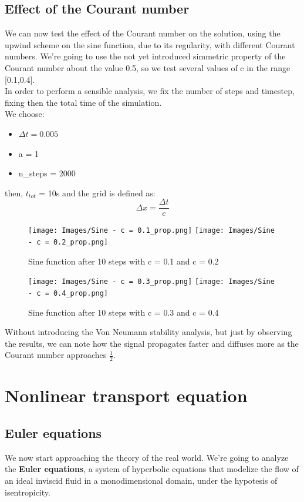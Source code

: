 \documentclass{report}
\begin{document}
\section*{Effect of the Courant number}
We can now test the effect of the Courant number on the solution, using the upwind scheme on the sine function, due to its regularity, with different Courant numbers.
We're going to use the not yet introduced simmetric property of the Courant number about the value 0.5, so we test several values of c in the range [0.1,0.4].\\
In order to perform a sensible analysis, we fix the number of steps and timestep, fixing then the total time of the simulation.\\
We choose:
\begin{itemize}[label={}]
    \item $\Delta t = 0.005$
    \item a = 1
    \item n\_steps = 2000
\end{itemize}
then, $t_{tot}$ = 10s and the grid is defined as:
\begin{equation*}
    \Delta x = \frac{\Delta t}{c}
\end{equation*}
\begin{figure}[H]
    \centering
    \texttt{[image: Images/Sine - c = 0.1\_prop.png]}
    \texttt{[image: Images/Sine - c = 0.2\_prop.png]}
    \caption{Sine function after 10 steps with c = 0.1 and c = 0.2}
    \label{fig:sine_res_c}
\end{figure}
\begin{figure}[H]
    \centering
    \texttt{[image: Images/Sine - c = 0.3\_prop.png]}
    \texttt{[image: Images/Sine - c = 0.4\_prop.png]}
    \caption{Sine function after 10 steps with c = 0.3 and c = 0.4}
    \label{fig:sine_res_c2}
\end{figure}

Without introducing the Von Neumann stability analysis, but just by observing the results, we can note
how the signal propagates faster and diffuses more as the Courant number approaches $\frac{1}{2}$.

\chapter*{Nonlinear transport equation}
\section*{Euler equations}
We now start approaching the theory of the real world.
We're going to analyze the \textbf{Euler equations}, a system of hyperbolic equations that modelize the flow of an ideal inviscid fluid in a monodimensional domain, under the hypotesis of isentropicity.
\end{document}
